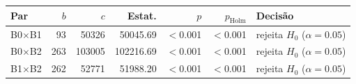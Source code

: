 \begin{tabular}{lrrrrrl}
\toprule
Par & $b$ & $c$ & Estat. & $p$ & $p_{\text{Holm}}$ & Decisão \\
\midrule
B0$\times$B1 & 93 & 50326 & 50045.69 & $<$0.001 & $<$0.001 & rejeita $H_0$ ($\alpha=0.05$) \\
B0$\times$B2 & 263 & 103005 & 102216.69 & $<$0.001 & $<$0.001 & rejeita $H_0$ ($\alpha=0.05$) \\
B1$\times$B2 & 262 & 52771 & 51988.20 & $<$0.001 & $<$0.001 & rejeita $H_0$ ($\alpha=0.05$) \\
\bottomrule
\end{tabular}
